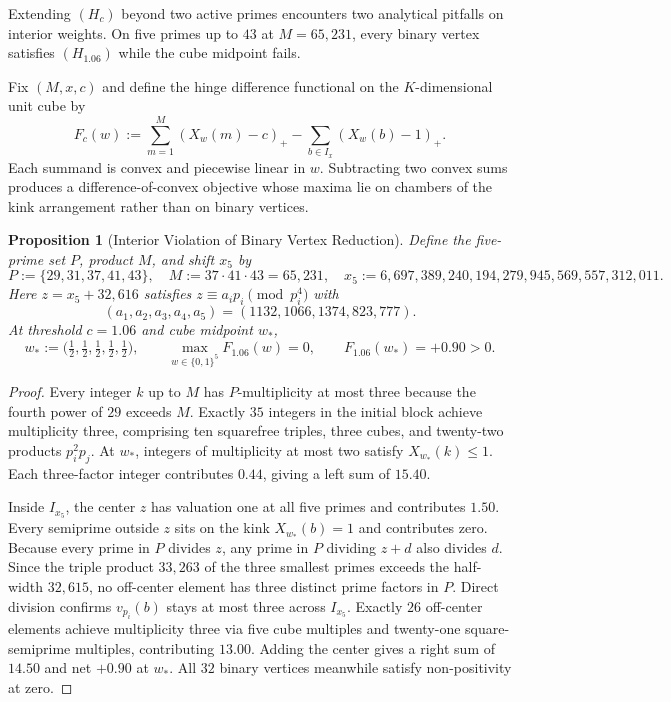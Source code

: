 \documentclass[11pt]{article}
\newtheorem{proposition}[theorem]{Proposition}
\begin{document}
Extending $(H_c)$ beyond two active primes encounters two analytical pitfalls on interior weights. On five primes up to $43$ at $M = 65{,}231$, every binary vertex satisfies $(H_{1.06})$ while the cube midpoint fails.

Fix $(M, x, c)$ and define the hinge difference functional on the $K$-dimensional unit cube by
\[
F_c(w) := \sum_{m = 1}^M (X_w(m) - c)_+ - \sum_{b \in I_x} (X_w(b) - 1)_+.
\]
Each summand is convex and piecewise linear in $w$. Subtracting two convex sums produces a difference-of-convex objective whose maxima lie on chambers of the kink arrangement rather than on binary vertices.

\begin{proposition}[Interior Violation of Binary Vertex Reduction]
\label{prop:dc}
Define the five-prime set $P$, product $M$, and shift $x_5$ by
\[
P := \{29, 31, 37, 41, 43\}, \quad M := 37 \cdot 41 \cdot 43 = 65{,}231, \quad x_5 := 6{,}697{,}389{,}240{,}194{,}279{,}945{,}569{,}557{,}312{,}011.
\]
Here $z = x_5 + 32{,}616$ satisfies $z \equiv a_i p_i \pmod{p_i^4}$ with
\[
(a_1, a_2, a_3, a_4, a_5) = (1132, 1066, 1374, 823, 777).
\]
At threshold $c = 1.06$ and cube midpoint $w_*$,
\[
w_* := \bigl(\tfrac{1}{2}, \tfrac{1}{2}, \tfrac{1}{2}, \tfrac{1}{2}, \tfrac{1}{2}\bigr), \qquad \max_{w \in \{0, 1\}^5} F_{1.06}(w) = 0, \qquad F_{1.06}(w_*) = +0.90 > 0.
\]
\end{proposition}
\begin{proof}
Every integer $k$ up to $M$ has $P$-multiplicity at most three because the fourth power of $29$ exceeds $M$. Exactly $35$ integers in the initial block achieve multiplicity three, comprising ten squarefree triples, three cubes, and twenty-two products $p_i^2 p_j$. At $w_*$, integers of multiplicity at most two satisfy $X_{w_*}(k) \le 1$. Each three-factor integer contributes $0.44$, giving a left sum of $15.40$.

Inside $I_{x_5}$, the center $z$ has valuation one at all five primes and contributes $1.50$. Every semiprime outside $z$ sits on the kink $X_{w_*}(b) = 1$ and contributes zero. Because every prime in $P$ divides $z$, any prime in $P$ dividing $z + d$ also divides $d$. Since the triple product $33{,}263$ of the three smallest primes exceeds the half-width $32{,}615$, no off-center element has three distinct prime factors in $P$. Direct division confirms $v_{p_i}(b)$ stays at most three across $I_{x_5}$. Exactly $26$ off-center elements achieve multiplicity three via five cube multiples and twenty-one square-semiprime multiples, contributing $13.00$. Adding the center gives a right sum of $14.50$ and net $+0.90$ at $w_*$. All $32$ binary vertices meanwhile satisfy non-positivity at zero.
\end{proof}
\end{document}
